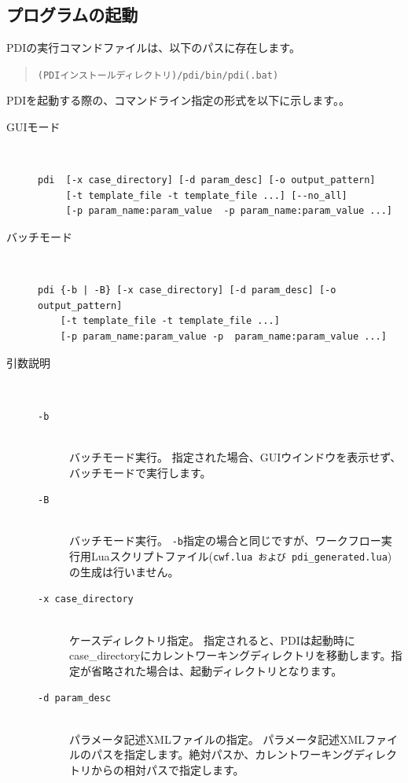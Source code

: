 \documentclass[a4paper,11pt]{jarticle}
\begin{document}
\subsection{プログラムの起動}

PDIの実行コマンドファイルは、以下のパスに存在します。

\begin{quote}
{\tt (PDIインストールディレクトリ)/pdi/bin/pdi(.bat)}
\end{quote}

PDIを起動する際の、コマンドライン指定の形式を以下に示します。。

\begin{description}
\item[GUIモード] {\ }
\begin{verbatim}
pdi  [-x case_directory] [-d param_desc] [-o output_pattern]
     [-t template_file -t template_file ...] [--no_all]
     [-p param_name:param_value  -p param_name:param_value ...]
\end{verbatim}

\item[バッチモード] {\ }
\begin{verbatim}
pdi {-b | -B} [-x case_directory] [-d param_desc] [-o output_pattern]
    [-t template_file -t template_file ...]
    [-p param_name:param_value -p  param_name:param_value ...]
\end{verbatim}

\item[引数説明] {\ }
\begin{description}
\item[{\tt -b}] {\ }\\
バッチモード実行。
指定された場合、GUIウインドウを表示せず、バッチモードで実行します。
\item[{\tt -B}] {\ }\\
バッチモード実行。
{\tt -b}指定の場合と同じですが、ワークフロー実行用Luaスクリプトファイル({\tt cwf.lua および pdi\_generated.lua})の生成は行いません。
\item[{\tt -x  case\_directory}] {\ }\\
ケースディレクトリ指定。
指定されると、PDIは起動時にcase\_directoryにカレントワーキングディレクトリを移動します。指定が省略された場合は、起動ディレクトリとなります。

\item[{\tt -d  param\_desc}] {\ }\\
パラメータ記述XMLファイルの指定。
パラメータ記述XMLファイルのパスを指定します。絶対パスか、カレントワーキングディレクトリからの相対パスで指定します。


\end{description}
\end{description}
\end{document}

